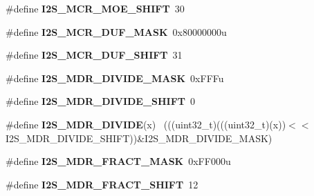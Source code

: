 \begin{DoxyCompactItemize}
\item 
\hypertarget{group___i2_s___register___masks_ga9e216aa29a6bff56351f468e127fbea5}{}\#define {\bfseries I2\+S\+\_\+\+M\+C\+R\+\_\+\+M\+O\+E\+\_\+\+S\+H\+I\+F\+T}~30\label{group___i2_s___register___masks_ga9e216aa29a6bff56351f468e127fbea5}

\item 
\hypertarget{group___i2_s___register___masks_ga215e9b824f46df65ca2fc57784148cae}{}\#define {\bfseries I2\+S\+\_\+\+M\+C\+R\+\_\+\+D\+U\+F\+\_\+\+M\+A\+S\+K}~0x80000000u\label{group___i2_s___register___masks_ga215e9b824f46df65ca2fc57784148cae}

\item 
\hypertarget{group___i2_s___register___masks_gae490aa013a4b379ce12be811ae32a148}{}\#define {\bfseries I2\+S\+\_\+\+M\+C\+R\+\_\+\+D\+U\+F\+\_\+\+S\+H\+I\+F\+T}~31\label{group___i2_s___register___masks_gae490aa013a4b379ce12be811ae32a148}

\item 
\hypertarget{group___i2_s___register___masks_ga3b44d8acfaecde14d97877635d471e13}{}\#define {\bfseries I2\+S\+\_\+\+M\+D\+R\+\_\+\+D\+I\+V\+I\+D\+E\+\_\+\+M\+A\+S\+K}~0x\+F\+F\+Fu\label{group___i2_s___register___masks_ga3b44d8acfaecde14d97877635d471e13}

\item 
\hypertarget{group___i2_s___register___masks_ga96fc58c33527f6dba2be28151ecdb6b2}{}\#define {\bfseries I2\+S\+\_\+\+M\+D\+R\+\_\+\+D\+I\+V\+I\+D\+E\+\_\+\+S\+H\+I\+F\+T}~0\label{group___i2_s___register___masks_ga96fc58c33527f6dba2be28151ecdb6b2}

\item 
\hypertarget{group___i2_s___register___masks_ga27b229fb2b9134f4c31ef4df4634caae}{}\#define {\bfseries I2\+S\+\_\+\+M\+D\+R\+\_\+\+D\+I\+V\+I\+D\+E}(x)                                            ~(((uint32\+\_\+t)(((uint32\+\_\+t)(x))$<$$<$I2\+S\+\_\+\+M\+D\+R\+\_\+\+D\+I\+V\+I\+D\+E\+\_\+\+S\+H\+I\+F\+T))\&I2\+S\+\_\+\+M\+D\+R\+\_\+\+D\+I\+V\+I\+D\+E\+\_\+\+M\+A\+S\+K)\label{group___i2_s___register___masks_ga27b229fb2b9134f4c31ef4df4634caae}

\item 
\hypertarget{group___i2_s___register___masks_ga0686acbd342566fcf227b91122b901cc}{}\#define {\bfseries I2\+S\+\_\+\+M\+D\+R\+\_\+\+F\+R\+A\+C\+T\+\_\+\+M\+A\+S\+K}~0x\+F\+F000u\label{group___i2_s___register___masks_ga0686acbd342566fcf227b91122b901cc}

\item 
\hypertarget{group___i2_s___register___masks_gab4cc6d27bd245719343b0e868ffb4bb4}{}\#define {\bfseries I2\+S\+\_\+\+M\+D\+R\+\_\+\+F\+R\+A\+C\+T\+\_\+\+S\+H\+I\+F\+T}~12\label{group___i2_s___register___masks_gab4cc6d27bd245719343b0e868ffb4bb4}


\end{DoxyCompactItemize}
